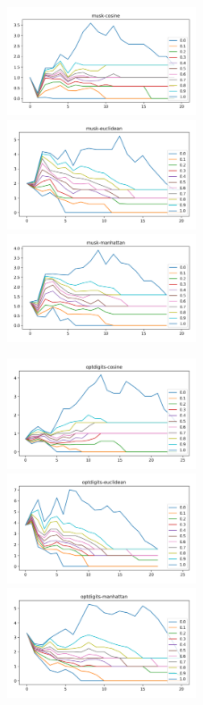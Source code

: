 \begin{figure}[!t]
\includegraphics[width=2.2in]{kdd/static/lfd_vs_depth/musk-cosine.png}
\includegraphics[width=2.2in]{kdd/static/lfd_vs_depth/musk-euclidean.png}
\includegraphics[width=2.2in]{kdd/static/lfd_vs_depth/musk-manhattan.png}

\includegraphics[width=2.2in]{kdd/static/lfd_vs_depth/optdigits-cosine.png}
\includegraphics[width=2.2in]{kdd/static/lfd_vs_depth/optdigits-euclidean.png}
\includegraphics[width=2.2in]{kdd/static/lfd_vs_depth/optdigits-manhattan.png}


\end{figure}
